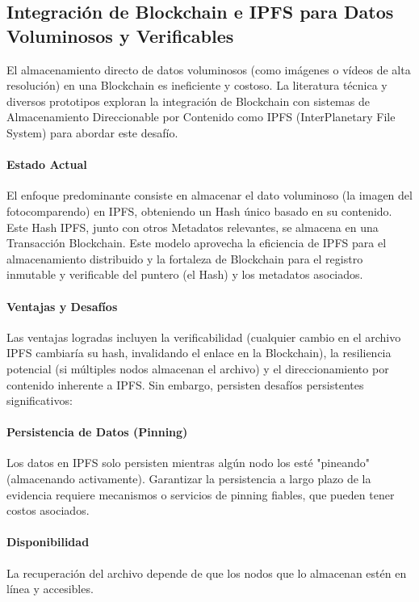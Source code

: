 \documentclass[
    letterpaper, 
    man,   
    spanish,
    12pt,
    donotrepeattitle,
    floatsintext,
    hidelinks %
]{apa7}
\begin{document}
\subsection{Integración de Blockchain e IPFS para Datos Voluminosos y Verificables} 

El almacenamiento directo de datos voluminosos (como imágenes o vídeos de alta resolución) en una Blockchain es ineficiente y costoso. La literatura técnica y diversos prototipos exploran la integración de Blockchain con sistemas de Almacenamiento Direccionable por Contenido como IPFS (InterPlanetary File System) para abordar este desafío. 

\paragraph{Estado Actual} El enfoque predominante consiste en almacenar el dato voluminoso (la imagen del fotocomparendo) en IPFS, obteniendo un Hash único basado en su contenido. Este Hash IPFS, junto con otros Metadatos relevantes, se almacena en una Transacción Blockchain. Este modelo aprovecha la eficiencia de IPFS para el almacenamiento distribuido y la fortaleza de Blockchain para el registro inmutable y verificable del puntero (el Hash) y los metadatos asociados. 

\paragraph{Ventajas y Desafíos} Las ventajas logradas incluyen la verificabilidad (cualquier cambio en el archivo IPFS cambiaría su hash, invalidando el enlace en la Blockchain), la resiliencia potencial (si múltiples nodos almacenan el archivo) y el direccionamiento por contenido inherente a IPFS. Sin embargo, persisten desafíos persistentes significativos: 

\paragraph{Persistencia de Datos (Pinning)} Los datos en IPFS solo persisten mientras algún nodo los esté "pineando" (almacenando activamente). Garantizar la persistencia a largo plazo de la evidencia requiere mecanismos o servicios de pinning fiables, que pueden tener costos asociados. 

\paragraph{Disponibilidad} La recuperación del archivo depende de que los nodos que lo almacenan estén en línea y accesibles. 
\end{document}
